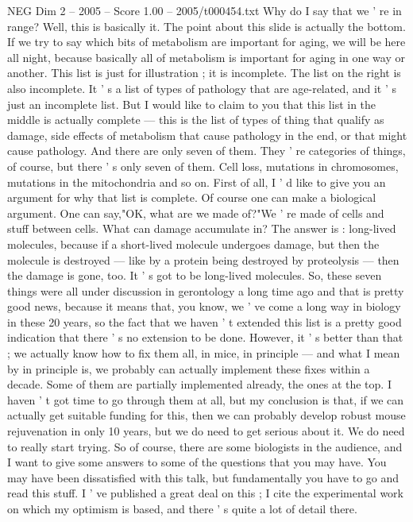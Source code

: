 \begin{textsample}{NEG Dim 2 – 2005 – Score 1.00 – 2005/t000454.txt}
Why do I say that we ' re in range?
Well, this is basically it.
The point about this slide is actually the bottom.
If we try to say which bits of metabolism are important for aging, we will be here all night, because basically all of metabolism is important for aging in one way or another.
This list is just for illustration ; it is incomplete.
The list on the right is also incomplete.
It ' s a list of types of pathology that are age-related, and it ' s just an incomplete list.
But I would like to claim to you that this list in the middle is actually complete — this is the list of types of thing that qualify as damage, side effects of metabolism that cause pathology in the end, or that might cause pathology.
And there are only seven of them.
They ' re categories of things, of course, but there ' s only seven of them.
Cell loss, mutations in chromosomes, mutations in the mitochondria and so on.
First of all, I ' d like to give you an argument for why that list is complete.
Of course one can make a biological argument.
One can say,"OK, what are we made of?"We ' re made of cells and stuff between cells.
What can damage accumulate in?
The answer is : long-lived molecules, because if a short-lived molecule undergoes damage, but then the molecule is destroyed — like by a protein being destroyed by proteolysis — then the damage is gone, too.
It ' s got to be long-lived molecules.
So, these seven things were all under discussion in gerontology a long time ago and that is pretty good news, because it means that, you know, we ' ve come a long way in biology in these 20 years, so the fact that we haven ' t extended this list is a pretty good indication that there ' s no extension to be done.
However, it ' s better than that ; we actually know how to fix them all, in mice, in principle — and what I mean by in principle is, we probably can actually implement these fixes within a decade.
Some of them are partially implemented already, the ones at the top.
I haven ' t got time to go through them at all, but my conclusion is that, if we can actually get suitable funding for this, then we can probably develop robust mouse rejuvenation in only 10 years, but we do need to get serious about it.
We do need to really start trying.
So of course, there are some biologists in the audience, and I want to give some answers to some of the questions that you may have.
You may have been dissatisfied with this talk, but fundamentally you have to go and read this stuff.
I ' ve published a great deal on this ; I cite the experimental work on which my optimism is based, and there ' s quite a lot of detail there.

\end{textsample}
